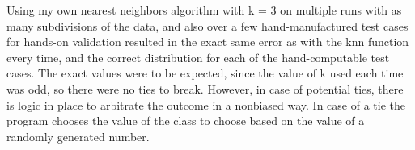 \documentclass[11pt]{article}
\begin{document}
\begin{enumerate}
\begin{enumerate}
\end{enumerate}

Using my own nearest neighbors algorithm with k = 3 on multiple runs with 
as many subdivisions of the data, and also over a few hand-manufactured 
test cases for hands-on validation resulted in the exact same error as with 
the knn function every time, and the correct distribution for each of the 
hand-computable test cases. The exact values were to be expected, since the 
value of k used each time was odd, so there were no ties to break. 
However, in case of potential ties, there is logic in place to arbitrate the 
outcome in a nonbiased way. 
In case of a tie the program chooses the value of the class to choose 
based on the value of a randomly generated number. 

\end{enumerate}
\end{document}
